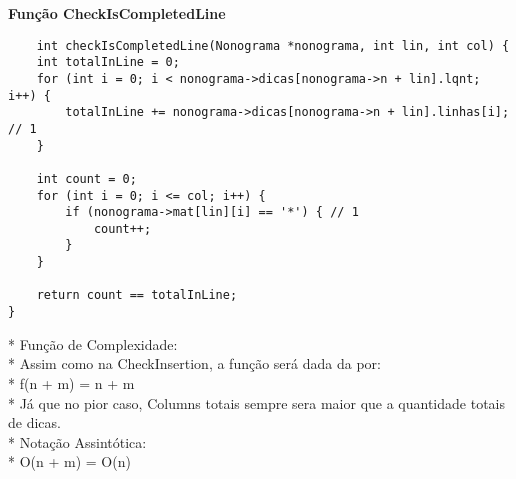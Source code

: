 \documentclass{article}
\begin{document}
\begin{center}
   \textbf{Função CheckIsCompletedLine}
\end{center}
\begin{lstlisting}
    int checkIsCompletedLine(Nonograma *nonograma, int lin, int col) {
    int totalInLine = 0;
    for (int i = 0; i < nonograma->dicas[nonograma->n + lin].lqnt; i++) {
        totalInLine += nonograma->dicas[nonograma->n + lin].linhas[i]; // 1
    }

    int count = 0;
    for (int i = 0; i <= col; i++) {
        if (nonograma->mat[lin][i] == '*') { // 1
            count++;
        }
    }

    return count == totalInLine;
}
\end{lstlisting}
\begin{center}
   * Função de Complexidade:\\
   * Assim como na CheckInsertion, a função será dada da por:\\
   * f(n + m) = n + m\\
   * Já que no pior caso, Columns totais sempre sera maior que a quantidade totais de dicas.\\
   * Notação Assintótica:\\
   * O(n + m) = O(n)\\

\end{center}
\end{document}
